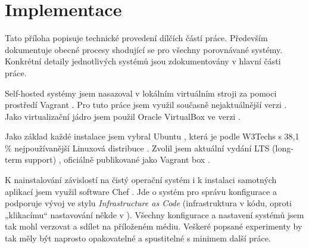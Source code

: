 \chapter{Implementace}

Tato příloha popisuje technické provedení dílčích částí práce. Především dokumentuje obecné procesy shodující se pro všechny porovnávané \CICD systémy. Konkrétní detaily jednotlivých systémů jsou zdokumentovány v hlavní části práce.

Self-hosted \CICD systémy jsem nasazoval v lokálním virtuálním stroji za pomoci prostředí Vagrant \cite{hashimoto-vagrant}\cite{susanka-vagrant}. Pro tuto práce jsem využil současně nejaktuálnější verzi . Jako virtualizační jádro jsem použil Oracle VirtualBox \cite{virtualbox} ve verzi .

Jako základ každé instalace jsem vybral Ubuntu \cite{ubuntu}, která je podle W3Techs s 38,1 \% nejpoužívanější Linuxová distribuce \cite{w3techs-stats}. Zvolil jsem aktuální vydání LTS (long-term support) , oficiálně publikované jako Vagrant box .

K nainstalování závislostí na čistý operační systém i k instalaci samotných aplikací jsem využil software Chef \cite{chef}. Jde o systém pro správu konfigurace a podporuje vývoj ve stylu \textit{Infrastructure as Code} (infrastruktura v kódu, oproti „klikacímu“ nastavování někde v ). Všechny konfigurace a nastavení systémů jsem tak mohl verzovat a sdílet na příloženém médiu. Veškeré popsané experimenty by tak měly být naprosto opakovatelné a spustitelné s minimem další práce.
